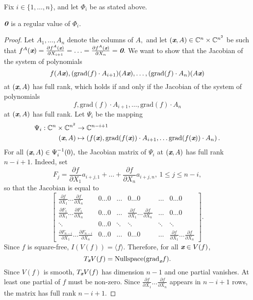 \documentclass[sigconf]{acmart}
\def\bz{\textit{\textbf{0}}}
\def\xb{\textit{\textbf{x}}}
\def\C{\mathbb{C}}
\def\grad{\textrm{grad}}
\def\pa{\partial}
\begin{document}
Fix $i \in \{1,\hdots,n\}$, and let $\Phi_i$ be as stated above.
%
\begin{proposition} 
$\bz$ is a regular value of $\Phi_i$.
\end{proposition}
%
\begin{proof}
Let $A_1,\hdots,A_n$ denote the columns of $A,$ and let $(\xb,A) \in \C^n \times \C^{n^2}$ be such that 
$f^A(\xb) = \frac{\partial f^A(\xb)}{\partial X_{i+1}}=\hdots= \frac{\partial f^A(\xb)}{\partial X_n}=\bz.$
We want to show that the Jacobian of the system of polynomials 
\[
f(A\xb),(\grad(f)\cdot A_{i+1})(A\xb),\hdots, (\grad(f)\cdot A_n)(A\xb)
\]
at $(\xb,A)$ has full rank, which holds if and only if the Jacobian of the system of polynomials 
\[
f,\grad(f)\cdot A_{i+1},\hdots, \grad(f)\cdot A_n
\]
at $(\xb,A)$ has full rank. Let $\Psi_i$ be the mapping
%
\begin{align*}
    \Psi_i: \C^n \times \C^{n^2} &\rightarrow \C^{n-i+1} \\
       (\xb,A) &\mapsto 
       \left(f(\xb),\grad(f(\xb))\cdot 
A_{i+1},\hdots
\grad(f(\xb))\cdot 
A_{n}
\right).
\end{align*}
%
For all $(\xb,A) \in \Psi_i^{-1}(0),$ the Jacobian matrix of $\Psi_i$ at $(\xb,A)$ has full rank $n-i+1$. Indeed, set 
\[
F_j = \frac{\pa f}{\pa X_1} a_{i+j,1} + \hdots + \frac{\pa f}{\pa X_n}a_{i+j,n}, ~1 \leq j \leq n-i,
\]
so that the Jacobian is equal to
\[
\left[ 
\begin{array}{cccccc}
\frac{\pa f}{\pa X_1} \hdots \frac{\pa f}{\pa X_n}            &0\hdots 0&\hdots& 0 \hdots 0                                         & \hdots & 0\hdots 0 \\ 
\frac{\pa F_{1}}{\pa X_1}\hdots \frac{\pa F_{1}}{\pa X_n}     &0\hdots 0&\hdots& \frac{\pa f}{\pa X_1} \hdots \frac{\pa f}{\pa X_n} & \hdots & 0\hdots 0 \\
\ddots                                                        &0\hdots 0&\ddots&\ddots                                              & \ddots & \ddots \\
\frac{\pa F_{n-i}}{\pa X_1}\hdots \frac{\pa F_{n-i}}{\pa X_n} &0\hdots 0&\hdots&0 \hdots 0&  \hdots & \frac{\pa f}{\pa X_1} \hdots \frac{\pa f}{\pa X_n}  
\end{array}
\right]. 
\] 
Since $f$ is square-free, $I(V(f)) = \langle f \rangle.$ Therefore, for all $\xb \in V(f)$, 
\[
T_{\xb} V(f) = \textrm{Nullspace}(\grad_{\xb} f).
\]
Since $V(f)$ is smooth, $T_{\xb} V(f)$ has dimension $n-1$ and one partial vanishes. At least one partial of $f$ must be non-zero. Since  $\frac{\pa f}{\pa X_1} \hdots \frac{\pa f}{\pa X_n}$ appears in $n-i+1$ rows, the matrix has full rank $n-i+1$.
\end{proof}
\end{document}

